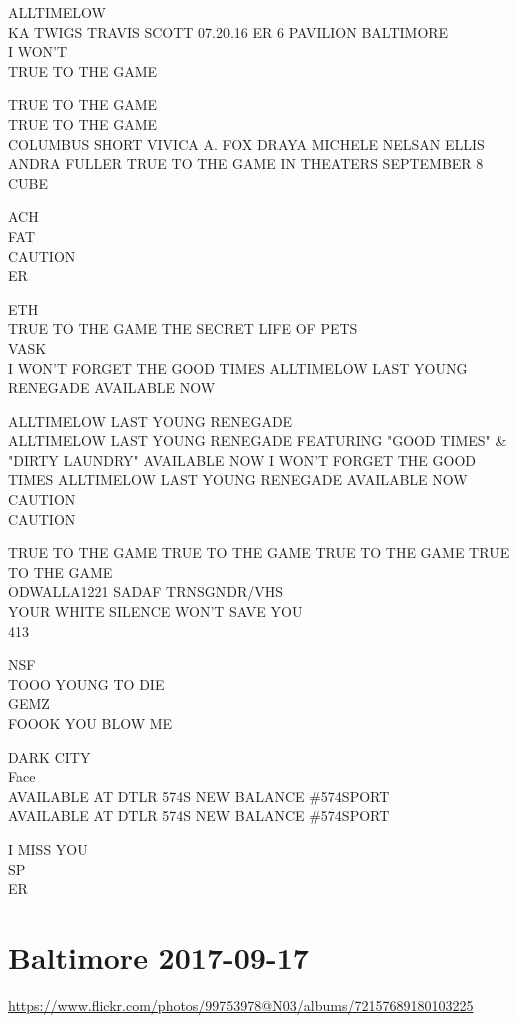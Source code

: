 \documentclass[10pt,letterpaper]{article}
\begin{document}
ALLTIMELOW\\
KA TWIGS TRAVIS SCOTT 07.20.16 ER 6 PAVILION BALTIMORE\\
I WON'T\\
TRUE TO THE GAME

TRUE TO THE GAME\\
TRUE TO THE GAME\\
COLUMBUS SHORT VIVICA A. FOX DRAYA MICHELE NELSAN ELLIS ANDRA FULLER TRUE TO THE GAME IN THEATERS SEPTEMBER 8\\
CUBE

ACH\\
FAT\\
CAUTION\\
ER

ETH\\
TRUE TO THE GAME THE SECRET LIFE OF PETS\\
VASK\\
I WON'T FORGET THE GOOD TIMES ALLTIMELOW LAST YOUNG RENEGADE AVAILABLE NOW

ALLTIMELOW LAST YOUNG RENEGADE\\
ALLTIMELOW LAST YOUNG RENEGADE FEATURING "GOOD TIMES" \& "DIRTY LAUNDRY" AVAILABLE NOW I WON'T FORGET THE GOOD TIMES ALLTIMELOW LAST YOUNG RENEGADE AVAILABLE NOW\\
CAUTION\\
CAUTION

TRUE TO THE GAME TRUE TO THE GAME TRUE TO THE GAME TRUE TO THE GAME\\
ODWALLA1221 SADAF TRNSGNDR/VHS\\
YOUR WHITE SILENCE WON'T SAVE YOU\\
413

NSF\\
TOOO YOUNG TO DIE\\
GEMZ\\
FOOOK YOU BLOW ME

DARK CITY\\
Face\\
AVAILABLE AT DTLR 574S NEW BALANCE \#574SPORT\\
AVAILABLE AT DTLR 574S NEW BALANCE \#574SPORT

I MISS YOU\\
SP\\
ER


\section*{Baltimore 2017-09-17}

\url{https://www.flickr.com/photos/99753978@N03/albums/72157689180103225}
\end{document}
